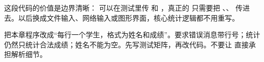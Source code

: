 这段代码的价值是边界清晰： 可以在测试里传  和 ，真正的  只需要把 、、 传进去。以后换成文件输入、网络输入或图形界面，核心统计逻辑都不用重写。

\begin{exercisebox}
把本章程序改成“每行一个学生，格式为姓名和成绩”。要求错误消息带行号；统计仍然只统计合法成绩；姓名不能为空。先写测试矩阵，再改代码。不要让  直接承担解析细节。
\end{exercisebox}
